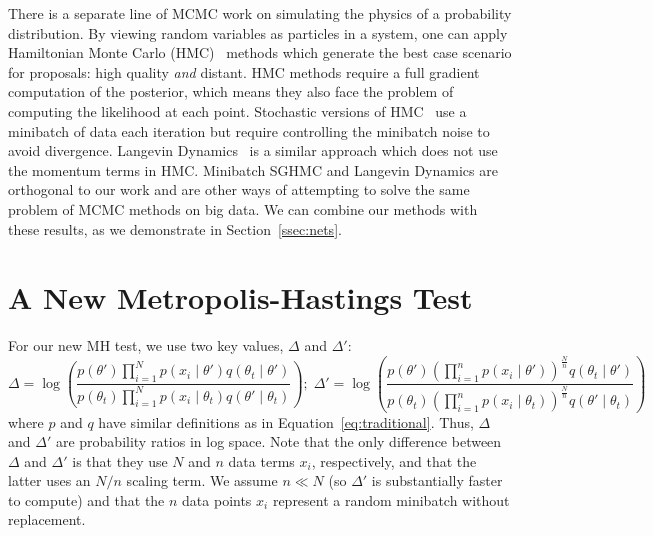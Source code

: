 \documentclass{article}
\begin{document}
There is a separate line of MCMC work on simulating the physics of a probability distribution. By
viewing random variables as particles in a system, one can apply Hamiltonian Monte Carlo
(HMC)~\cite{mcmc_hamiltonian_2010} methods which generate the best case scenario for proposals: high
quality \emph{and} distant.  HMC methods require a full gradient computation of the posterior, which
means they also face the problem of computing the likelihood at each point. Stochastic versions of
HMC~\cite{sghmc_2014,stochastic_thermostats_2014} use a minibatch of data each iteration but require
controlling the minibatch noise to avoid divergence. Langevin
Dynamics~\cite{langevin_2011,conf/icml/AhnBW12} is a similar approach which does not use the
momentum terms in HMC.  Minibatch SGHMC and Langevin Dynamics are orthogonal to our work and are
other ways of attempting to solve the same problem of MCMC methods on big data. We can combine our
methods with these results, as we demonstrate in Section~\ref{ssec:nets}.





\section{A New Metropolis-Hastings Test}\label{sec:our_algorithm}

For our new MH test, we use two key values, $\Delta$ and $\Delta'$:
\begin{equation}\label{eq:deltas}
\Delta = \log \left( \frac{p(\theta')  \prod_{i=1}^N p(x_i \mid \theta')  q(\theta_t \mid
\theta')}{p(\theta_t)\prod_{i=1}^N p(x_i \mid \theta_t)  q(\theta' \mid
\theta_t)} \right);\;  \Delta' = \log \left( \frac{p(\theta') (\prod_{i=1}^n p(x_i \mid
\theta'))^{\frac{N}{n}} q(\theta_t \mid \theta')}{p(\theta_t) (\prod_{i=1}^n p(x_i \mid
\theta_t))^{\frac{N}{n}} q(\theta' \mid \theta_t)} \right)
\end{equation}
where $p$ and $q$ have similar definitions as in Equation~\ref{eq:traditional}. Thus, $\Delta$ and
$\Delta'$ are probability ratios in log space. Note that the only difference between $\Delta$ and
$\Delta'$ is that they use $N$ and $n$ data terms $x_i$, respectively, and that the latter uses an
$N/n$ scaling term. We assume $n \ll N$ (so $\Delta'$ is substantially faster to compute) and that
the $n$ data points $x_i$ represent a random minibatch without replacement.
\end{document}
